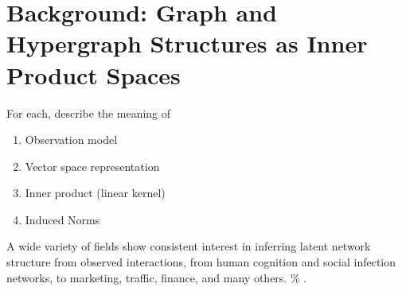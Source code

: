 \documentclass[%
	12pt,
		oneside,
		letterpaper
]{book}
\providecommand{\tightlist}{%
  \setlength{\itemsep}{0pt}\setlength{\parskip}{0pt}}\usepackage{longtable,booktabs,array}
\renewcommand{\contentsname}%
    {Table of contents}%
\renewcommand*\contentsname{Table of contents}
\newcommand\contentsname{Table of contents}
\begin{document}
    \renewcommand{\contentsname}{List of Tables}
\listoftables %
\newpage

    \renewcommand{\contentsname}{List of Figures}
\listoffigures %
\newpage

% 

\newpage
\setlength{\parskip}{0em}
\renewcommand{\baselinestretch}{2}
\small\normalsize





\chapter{}\label{section}

\part{Background: Graph and Hypergraph Structures as Inner Product
Spaces}

For each, describe the meaning of

\begin{enumerate}
\def\labelenumi{\arabic{enumi}.}
\tightlist
\item
  Observation model
\item
  Vector space representation
\item
  Inner product (linear kernel)
\item
  Induced Norms
\end{enumerate}

A wide variety of fields show consistent interest in inferring latent
network structure from observed interactions, from human cognition and
social infection networks, to marketing, traffic, finance, and many
others. \autocite{Inferringnetworksdiffusion_GomezRodriguez2012} \%
\autocite{ReconstructingNetworksUnknown_Peixoto2018}.
\end{document}
